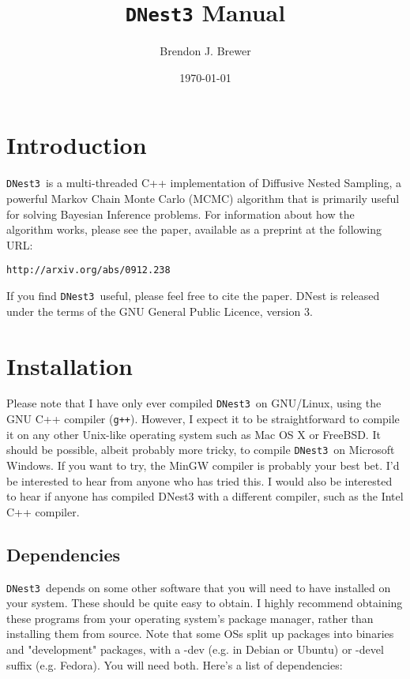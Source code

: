 \documentclass[a4paper, 11pt]{article}
\title{{\tt DNest3} Manual}
\author{Brendon J. Brewer}
\date{\today}
\newcommand{\dnest}{{\tt DNest3}}
\begin{document}
\maketitle

\section{Introduction}

\dnest~is a multi-threaded C++ implementation of Diffusive Nested Sampling, a
powerful Markov Chain Monte Carlo (MCMC) algorithm that is primarily
useful for solving Bayesian Inference problems. For information about how the
algorithm works, please see the paper, available as a preprint at the following
URL:

\begin{center}
{\tt http://arxiv.org/abs/0912.238}
\end{center}

If you find \dnest~useful, please feel free to cite the paper. DNest is
released under the terms of the GNU General Public Licence, version 3.

\section{Installation}
Please note that I have only ever compiled \dnest~on GNU/Linux,
using the GNU C++ compiler ({\tt g++}). However, I expect it to be
straightforward to compile it on any other Unix-like operating system such as Mac
OS X or FreeBSD. It should be possible, albeit probably more tricky,
to compile \dnest~on Microsoft Windows. If you want to try,
the MinGW compiler is
probably your best bet. I'd be interested to hear from anyone who
has tried this. I would also be interested to hear if anyone has
compiled DNest3 with a different compiler, such as the Intel C++
compiler.

\subsection{Dependencies}
\dnest~depends on some other software that you will need to have installed on
your system. These should be quite easy to obtain. I highly
recommend obtaining these programs from your operating system's package manager,
rather than installing them from source. Note that some OSs split up
packages into binaries and "development" packages, with a -dev (e.g.
in Debian or Ubuntu) or -devel suffix (e.g. Fedora). You will need
both. Here's a list of dependencies:
\end{document}
